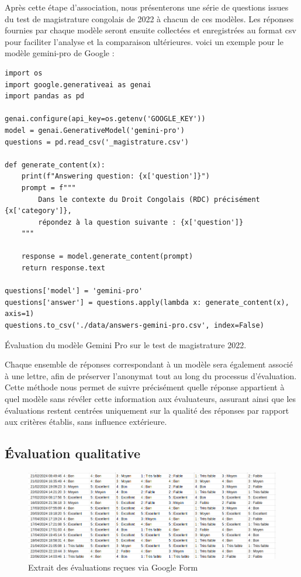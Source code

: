 Après cette étape d'association, nous présenterons une série de questions issues du test de magistrature congolais de 2022 à chacun de ces modèles. Les réponses fournies par chaque modèle seront ensuite collectées et enregistrées au format \ac{csv} pour faciliter l'analyse et la comparaison ultérieures. voici un exemple pour le modèle gemini-pro \cite{geminiteam2023gemini} de Google :

\begin{listing}[!ht]
\begin{verbatim}
import os
import google.generativeai as genai
import pandas as pd

genai.configure(api_key=os.getenv('GOOGLE_KEY'))
model = genai.GenerativeModel('gemini-pro')
questions = pd.read_csv('_magistrature.csv')

def generate_content(x):
    print(f"Answering question: {x['question']}")
    prompt = f"""
        Dans le contexte du Droit Congolais (RDC) précisément {x['category']},
        répondez à la question suivante : {x['question']}
    """

    response = model.generate_content(prompt)
    return response.text

questions['model'] = 'gemini-pro'
questions['answer'] = questions.apply(lambda x: generate_content(x), axis=1)
questions.to_csv('./data/answers-gemini-pro.csv', index=False)
\end{verbatim}
\caption{Évaluation du modèle Gemini Pro sur le test de magistrature 2022.}
\label{appendix:code:python:gemini-pro-evaluation}
\end{listing}

Chaque ensemble de réponses correspondant à un modèle sera également associé à une lettre, afin de préserver l'anonymat tout au long du processus d'évaluation. Cette méthode nous permet de suivre précisément quelle réponse appartient à quel modèle sans révéler cette information aux évaluateurs, assurant ainsi que les évaluations restent centrées uniquement sur la qualité des réponses par rapport aux critères établis, sans influence extérieure. 

\subsection{Évaluation qualitative}

\begin{figure}[H]
    \centering
    \includegraphics[width=15cm]{gfx/fig-eval.png}
    \caption{Extrait des évaluations reçues via Google Form}
    \label{fig:eval-result}
\end{figure}

